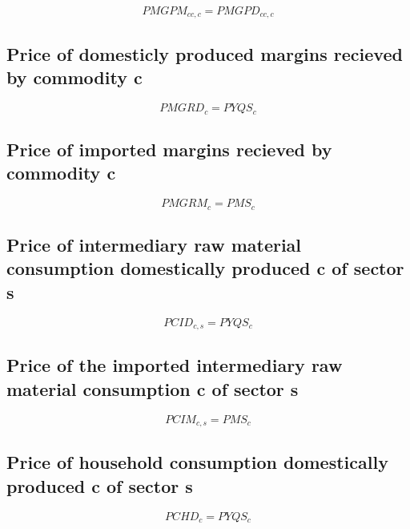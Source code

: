 \documentclass[12pt]{article}
\numberwithin{equation}{section}
\begin{document}
\begin{dmath}
PMGPM_{cc, c} = PMGPD_{cc, c}
\end{dmath}



\subsection{Price of domesticly produced margins recieved by commodity c}


\begin{dmath}
PMGRD_{c} = PYQS_{c}
\end{dmath}



\subsection{Price of imported margins recieved by commodity c}


\begin{dmath}
PMGRM_{c} = PMS_{c}
\end{dmath}



\subsection{Price of intermediary raw material consumption domestically produced c of sector s}


\begin{dmath}
PCID_{c, s} = PYQS_{c}
\end{dmath}



\subsection{Price of the imported intermediary raw material consumption c of sector s}


\begin{dmath}
PCIM_{c, s} = PMS_{c}
\end{dmath}



\subsection{Price of household consumption domestically produced c of sector s}


\begin{dmath}
PCHD_{c} = PYQS_{c}
\end{dmath}
\end{document}
